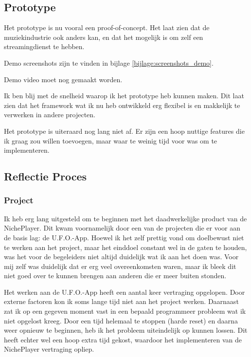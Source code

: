 \subsection{Prototype}
\begin{todolist}
  \item Het prototype is nu vooral een proof-of-concept. Het laat zien dat de muziekindustrie ook anders kan, en dat het mogelijk is om zelf een streamingdienst te hebben.
  \item Demo screenshots zijn te vinden in bijlage \ref{bijlage:screenshots_demo}.
  \item Demo video moet nog gemaakt worden.
  \item Ik ben blij met de snelheid waarop ik het prototype heb kunnen maken. Dit laat zien dat het framework wat ik nu heb ontwikkeld erg flexibel is en makkelijk te verwerken in andere projecten.
  \item Het prototype is uiteraard nog lang niet af. Er zijn een hoop nuttige features die ik graag zou willen toevoegen, maar waar te weinig tijd voor was om te implementeren.
\end{todolist}

\subsection{Reflectie Proces}

\subsubsection*{Project}
Ik heb erg lang uitgesteld om te beginnen met het daadwerkelijke product van de NichePlayer. Dit kwam voornamelijk door een van de projecten die er voor aan de basis lag: de U.F.O.-App. Hoewel ik het zelf prettig vond om doelbewust niet te werken aan het project, maar het einddoel constant wel in de gaten te houden, was het voor de begeleiders niet altijd duidelijk wat ik aan het doen was. Voor mij zelf was duidelijk dat er erg veel overeenkomsten waren, maar ik bleek dit niet goed over te kunnen brengen aan anderen die er meer buiten stonden.

Het werken aan de U.F.O.-App heeft een aantal keer vertraging opgelopen. Door externe factoren kon ik soms lange tijd niet aan het project werken. Daarnaast zat ik op een gegeven moment vast in een bepaald programmeer probleem wat ik niet opgelost kreeg. Door een tijd helemaal te stoppen (harde reset) en daarna weer opnieuw te beginnen, heb ik het probleem uiteindelijk op kunnen lossen. Dit heeft echter wel een hoop extra tijd gekost, waardoor het implementeren van de NichePlayer vertraging opliep.

